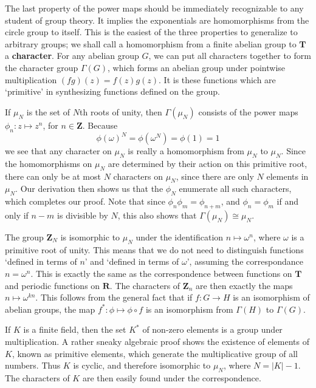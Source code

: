 The last property of the power maps should be immediately recognizable to any student of group theory. It implies the exponentials are homomorphisms from the circle group to itself. This is the easiest of the three properties to generalize to arbitrary groups; we shall call a homomorphism from a finite abelian group to $\mathbf{T}$ a {\bf character}. For any abelian group $G$, we can put all characters together to form the character group $\Gamma(G)$, which forms an abelian group under pointwise multiplication $(fg)(z) = f(z)g(z)$. It is these functions which are `primitive' in synthesizing functions defined on the group.

\begin{example}
    If $\mu_N$ is the set of $N$th roots of unity, then $\Gamma(\mu_N)$ consists of the power maps $\phi_n: z \mapsto z^n$, for $n \in \mathbf{Z}$. Because
    \[ \phi(\omega)^N = \phi(\omega^N) = \phi(1) = 1 \]
    we see that any character on $\mu_N$ is really a homomorphism from $\mu_N$ to $\mu_N$. Since the homomorphisms on $\mu_N$ are determined by their action on this primitive root, there can only be at most $N$ characters on $\mu_N$, since there are only $N$ elements in $\mu_N$. Our derivation then shows us that the $\phi_N$ enumerate all such characters, which completes our proof. Note that since $\phi_n \phi_m = \phi_{n+m}$, and $\phi_n = \phi_m$ if and only if $n - m$ is divisible by $N$, this also shows that $\Gamma(\mu_N) \cong \mu_N$.
\end{example}

\begin{example}
    The group $\mathbf{Z}_N$ is isomorphic to $\mu_N$ under the identification $n \mapsto \omega^n$, where $\omega$ is a primitive root of unity. This means that we do not need to distinguish functions `defined in terms of $n$' and `defined in terms of $\omega$', assuming the correspondance $n = \omega^n$. This is exactly the same as the correspondence between functions on $\mathbf{T}$ and periodic functions on $\mathbf{R}$. The characters of $\mathbf{Z}_n$ are then exactly the maps $n \mapsto \omega^{kn}$. This follows from the general fact that if $f: G \to H$ is an isomorphism of abelian groups, the map $f^*: \phi \mapsto \phi \circ f$ is an isomorphism from $\Gamma(H)$ to $\Gamma(G)$.
\end{example}

\begin{example}
    If $K$ is a finite field, then the set $K^*$ of non-zero elements is a group under multiplication. A rather sneaky algebraic proof shows the existence of elements of $K$, known as primitive elements, which generate the multiplicative group of all numbers. Thus $K$ is cyclic, and therefore isomorphic to $\mu_N$, where $N = |K| - 1$. The characters of $K$ are then easily found under the correspondence.
\end{example}

